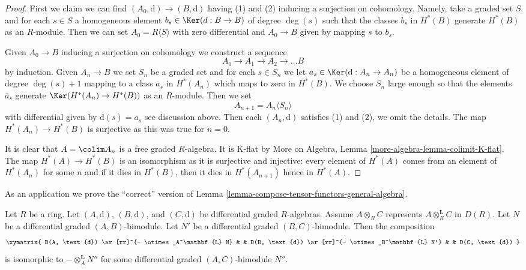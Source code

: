 \begin{proof}
First we claim we can find $(A_0, \text{d}) \to (B, \text{d})$
having (1) and (2) inducing a surjection on cohomology.
Namely, take a graded set $S$ and for each $s \in S$
a homogeneous element $b_s \in \Ker(d : B \to B)$ of degree $\deg(s)$
such that the classes $\overline{b}_s$ in $H^*(B)$
generate $H^*(B)$ as an $R$-module.
Then we can set $A_0 = R\langle S \rangle$ with zero differential
and $A_0 \to B$ given by mapping $s$ to $b_s$.

\medskip\noindent
Given $A_0 \to B$ inducing a surjection on cohomology we construct
a sequence
$$
A_0 \to A_1 \to A_2 \to \ldots B
$$
by induction. Given $A_n \to B$ we set $S_n$ be a graded set
and for each $s \in S_n$ we let $a_s \in \Ker(\text{d} : A_n \to A_n)$
be a homogeneous element of degree $\deg(s) + 1$
mapping to a class $\overline{a}_s$ in $H^*(A_n)$
which maps to zero in $H^*(B)$. We choose $S_n$ large enough
so that the elements $\overline{a}_s$ generate $\Ker(H^*(A_n) \to H^*(B))$
as an $R$-module. Then we set
$$
A_{n + 1} = A_n\langle S_n \rangle
$$
with differential given by $\text{d}(s) = a_s$ see discussion above.
Then each $(A_n, \text{d})$ satisfies (1) and (2), we omit the details.
The map $H^*(A_n) \to H^*(B)$ is surjective as this was true for $n = 0$.

\medskip\noindent
It is clear that $A = \colim A_n$ is a free graded $R$-algebra.
It is K-flat by More on Algebra, Lemma \ref{more-algebra-lemma-colimit-K-flat}.
The map $H^*(A) \to H^*(B)$ is an isomorphism as it is surjective
and injective: every element of $H^*(A)$ comes from an element of
$H^*(A_n)$ for some $n$ and if it dies in $H^*(B)$, then it dies
in $H^*(A_{n + 1})$ hence in $H^*(A)$.
\end{proof}

\noindent
As an application we prove the ``correct'' version of
Lemma \ref{lemma-compose-tensor-functors-general-algebra}.

\begin{lemma}
\label{lemma-compose-tensor-functors-tor}
Let $R$ be a ring. Let $(A, \text{d})$, $(B, \text{d})$, and
$(C, \text{d})$ be differential graded $R$-algebras. Assume
$A \otimes_R C$ represents $A \otimes^\mathbf{L}_R C$ in $D(R)$.
Let $N$ be a differential graded $(A, B)$-bimodule.
Let $N'$ be a differential graded $(B, C)$-bimodule.
Then the composition
$$
\xymatrix{
D(A, \text{d}) \ar[rr]^{- \otimes_A^\mathbf{L} N} & &
D(B, \text{d}) \ar[rr]^{- \otimes_B^\mathbf{L} N'} & &
D(C, \text{d})
}
$$
is isomorphic to $- \otimes_A^\mathbf{L} N''$ for some differential graded
$(A, C)$-bimodule $N''$.
\end{lemma}

